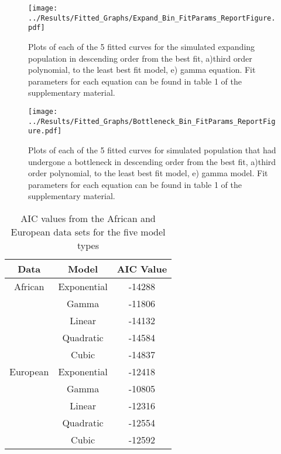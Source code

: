 \documentclass[11pt]{article}
\begin{document}
\begin{linenumbers}
\begin{figure}[htp]
\begin{center}
\texttt{[image: ../Results/Fitted\_Graphs/Expand\_Bin\_FitParams\_ReportFigure.pdf]}
\caption{\small Plots of each of the 5 fitted curves for the simulated expanding population in descending order from the best fit, a)third order polynomial, to the least best fit model, e) gamma equation. Fit parameters for each equation can be found in table 1 of the supplementary material.}
\end{center}
\end{figure}

\begin{figure}[htp]
\begin{center}
\texttt{[image: ../Results/Fitted\_Graphs/Bottleneck\_Bin\_FitParams\_ReportFigure.pdf]}
\caption{\small Plots of each of the 5 fitted curves for simulated population that had undergone a bottleneck in descending order from the best fit, a)third order polynomial, to the least best fit model, e) gamma model. Fit parameters for each equation can be found in table 1 of the supplementary material.}
\end{center}
\end{figure}

\begin{table}[htp]
\centering
\caption{AIC values from the African and European data sets for the five model types}
\label{table:1}
\begin{tabular}{c  c  c}
\hline
Data     & Model       & AIC Value \\
\hline
African  & Exponential & -14288    \\
         & Gamma       & -11806    \\
         & Linear      & -14132    \\
         & Quadratic   & -14584    \\
         & Cubic       & -14837    \\
\hline         
European & Exponential & -12418    \\
         & Gamma       & -10805    \\
         & Linear      & -12316    \\
         & Quadratic   & -12554    \\
         & Cubic       & -12592    \\
\hline

\end{tabular}
\end{table}


\end{linenumbers}
\end{document}

